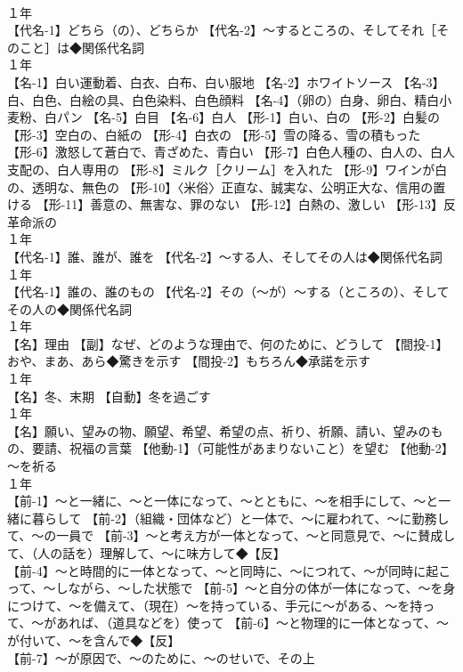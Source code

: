 \documentclass[8pt]{extreport}
\begin{document}
\begin{CJK}{UTF8}{min}
\\	１年	
\\	【代名-1】どちら（の）、どちらか 【代名-2】～するところの、そしてそれ［そのこと］は◆関係代名詞
\\	１年	
\\	【名-1】白い運動着、白衣、白布、白い服地 【名-2】ホワイトソース 【名-3】白、白色、白絵の具、白色染料、白色顔料 【名-4】（卵の）白身、卵白、精白小麦粉、白パン 【名-5】白目 【名-6】白人 【形-1】白い、白の 【形-2】白髪の 【形-3】空白の、白紙の 【形-4】白衣の 【形-5】雪の降る、雪の積もった 【形-6】激怒して蒼白で、青ざめた、青白い 【形-7】白色人種の、白人の、白人支配の、白人専用の 【形-8】ミルク［クリーム］を入れた 【形-9】ワインが白の、透明な、無色の 【形-10】〈米俗〉正直な、誠実な、公明正大な、信用の置ける 【形-11】善意の、無害な、罪のない 【形-12】白熱の、激しい 【形-13】反革命派の
\\	１年	
\\	【代名-1】誰、誰が、誰を 【代名-2】～する人、そしてその人は◆関係代名詞
\\	１年	
\\	【代名-1】誰の、誰のもの 【代名-2】その（～が）～する（ところの）、そしてその人の◆関係代名詞
\\	１年	
\\	【名】理由 【副】なぜ、どのような理由で、何のために、どうして 【間投-1】おや、まあ、あら◆驚きを示す 【間投-2】もちろん◆承諾を示す
\\	１年	
\\	【名】冬、末期 【自動】冬を過ごす
\\	１年	
\\	【名】願い、望みの物、願望、希望、希望の点、祈り、祈願、請い、望みのもの、要請、祝福の言葉 【他動-1】（可能性があまりないこと）を望む 【他動-2】～を祈る
\\	１年	
\\	【前-1】～と一緒に、～と一体になって、～とともに、～を相手にして、～と一緒に暮らして 【前-2】（組織・団体など）と一体で、～に雇われて、～に勤務して、～の一員で 【前-3】～と考え方が一体となって、～と同意見で、～に賛成して、（人の話を）理解して、～に味方して◆【反】
\\	【前-4】～と時間的に一体となって、～と同時に、～につれて、～が同時に起こって、～しながら、～した状態で 【前-5】～と自分の体が一体になって、～を身につけて、～を備えて、（現在）～を持っている、手元に～がある、～を持って、～があれば、（道具などを）使って 【前-6】～と物理的に一体となって、～が付いて、～を含んで◆【反】
\\	【前-7】～が原因で、～のために、～のせいで、その上

\end{CJK}
\end{document}
